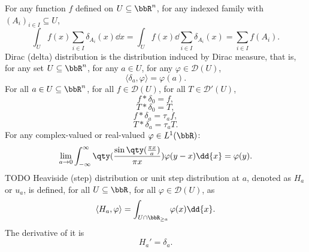 \documentclass[a4paper,12pt]{report}
\begin{document}
For any function $f$ defined on $U\subseteq\bbR^n$, for any indexed family with $(A_i)_{i\in I}\subseteq U$,
\[\int_Uf(x)\sum_{i\in I}\delta_{A_i}(x)\dd{x}=\int_Uf(x)\dd{\sum_{i\in I}\delta_{A_i}(x)}=\sum_{i\in I}f(A_i).\]
Dirac (delta) distribution is the distribution induced by Dirac measure, that is, for any set $U\subseteq\bbR^n$, for any $a\in U$, for any $\varphi\in\mathcal{D}(U)$,
\[\langle\delta_a,\varphi\rangle=\varphi(a).\]
For all $a\in U\subseteq\bbR^n$, for all $f\in\mathcal{D}(U)$, for all $T\in\mathcal{D}'(U)$,
\[f*\delta_0=f,\]
\[T*\delta_0=T,\]
\[f*\delta_a=\tau_af,\]
\[T*\delta_a=\tau_aT.\]
For any complex-valued or real-valued $\varphi\in L^1(\bbR)$:
\[\lim_{a\to 0}\int_{-\infty}^{\infty}\qty(\frac{\sin\qty(\frac{\pi x}{a})}{\pi x})\varphi(y-x)\dd{x}=\varphi(y).\]
\bpr
TODO
\epr
{}
Heaviside (step) distribution or unit step distribution at $a$, denoted as $H_a$ or $u_a$, is defined, for all $U\subseteq\bbR$, for all $\varphi\in\mathcal{D}(U)$, as
\[\langle H_a,\varphi\rangle=\int_{U\cap\bbR_{\geq a}}\varphi(x)\dd{x}.\]
The derivative of it is
\[H_a'=\delta_a.\]
\end{document}
